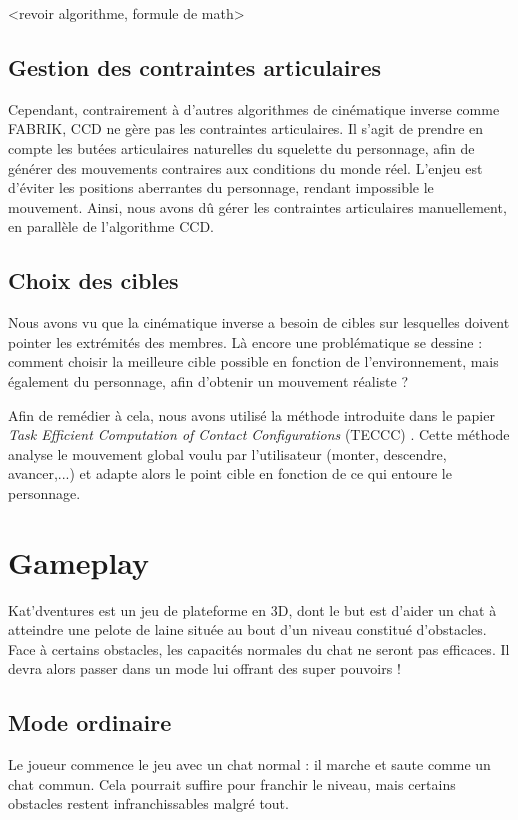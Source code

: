 \documentclass[a4paper,11pt]{article}
\begin{document}
<revoir algorithme, formule de math>



\subsection{Gestion des contraintes articulaires}
Cependant, contrairement à d'autres algorithmes de cinématique inverse comme FABRIK, CCD ne gère pas les contraintes articulaires. Il s'agit de prendre en compte les butées articulaires naturelles du squelette du personnage, afin de générer des mouvements contraires aux conditions du monde réel. L'enjeu est d'éviter les positions aberrantes du personnage, rendant impossible le mouvement. Ainsi, nous avons dû gérer les contraintes articulaires manuellement, en parallèle de l'algorithme CCD.

\subsection{Choix des cibles}
Nous avons vu que la cinématique inverse a besoin de cibles sur lesquelles doivent pointer les extrémités des membres. Là encore une problématique se dessine : comment choisir la meilleure cible possible en fonction de l'environnement, mais également du personnage, afin d'obtenir un mouvement réaliste ?

Afin de remédier à cela, nous avons utilisé la méthode introduite dans le papier \textit{Task Efficient Computation of Contact Configurations}  (TECCC) \cite{tonneau:latex:14}. Cette méthode analyse le mouvement global voulu par l'utilisateur (monter, descendre, avancer,...) et adapte alors le point cible en fonction de ce qui entoure le personnage. 


\section{Gameplay}
Kat'dventures est un jeu de plateforme en 3D, dont le but est d'aider un chat à atteindre une pelote de laine située au bout d'un niveau constitué d'obstacles. Face à certains obstacles, les capacités normales du chat ne seront pas efficaces. Il devra alors passer dans un mode lui offrant des super pouvoirs !
\subsection{Mode ordinaire}
Le joueur commence le jeu avec un chat normal : il marche et saute comme un chat commun. Cela pourrait suffire pour franchir le niveau, mais certains obstacles restent infranchissables malgré tout.
\end{document}

